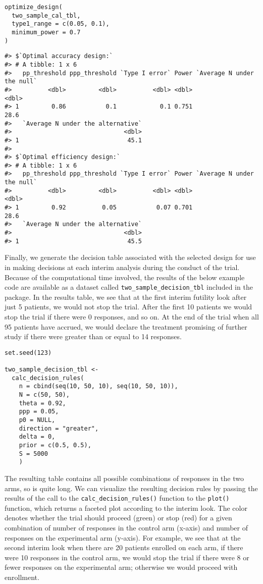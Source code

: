 \begin{verbatim}
optimize_design(
  two_sample_cal_tbl, 
  type1_range = c(0.05, 0.1), 
  minimum_power = 0.7
)
\end{verbatim}

\begin{verbatim}
#> $`Optimal accuracy design:`
#> # A tibble: 1 x 6
#>   pp_threshold ppp_threshold `Type I error` Power `Average N under the null`
#>          <dbl>         <dbl>          <dbl> <dbl>                      <dbl>
#> 1         0.86           0.1            0.1 0.751                       28.6
#>   `Average N under the alternative`
#>                               <dbl>
#> 1                              45.1
#> 
#> $`Optimal efficiency design:`
#> # A tibble: 1 x 6
#>   pp_threshold ppp_threshold `Type I error` Power `Average N under the null`
#>          <dbl>         <dbl>          <dbl> <dbl>                      <dbl>
#> 1         0.92          0.05           0.07 0.701                       28.6
#>   `Average N under the alternative`
#>                               <dbl>
#> 1                              45.5
\end{verbatim}

Finally, we generate the decision table associated with the selected design for use in making decisions at each interim analysis during the conduct of the trial. Because of the computational time involved, the results of the below example code are available as a dataset called \texttt{two\_sample\_decision\_tbl} included in the  package. In the results table, we see that at the first interim futility look after just 5 patients, we would not stop the trial. After the first 10 patients we would stop the trial if there were 0 responses, and so on. At the end of the trial when all 95 patients have accrued, we would declare the treatment promising of further study if there were greater than or equal to 14 responses.

\begin{verbatim}
set.seed(123)

two_sample_decision_tbl <- 
  calc_decision_rules(
    n = cbind(seq(10, 50, 10), seq(10, 50, 10)),
    N = c(50, 50),
    theta = 0.92, 
    ppp = 0.05, 
    p0 = NULL, 
    direction = "greater", 
    delta = 0, 
    prior = c(0.5, 0.5), 
    S = 5000
    )
\end{verbatim}

The resulting table contains all possible combinations of responses in the two arms, so is quite long. We can visualize the resulting decision rules by passing the results of the call to the \texttt{calc\_decision\_rules()} function to the \texttt{plot()} function, which returns a faceted plot according to the interim look. The color denotes whether the trial should proceed (green) or stop (red) for a given combination of number of responses in the control arm (x-axis) and number of responses on the experimental arm (y-axis). For example, we see that at the second interim look when there are 20 patients enrolled on each arm, if there were 10 responses in the control arm, we would stop the trial if there were 8 or fewer responses on the experimental arm; otherwise we would proceed with enrollment.

